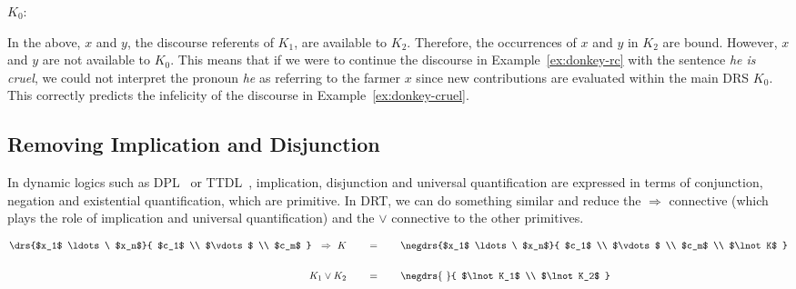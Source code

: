 \begin{flushleft}
  $K_0$: \hspace{-42mm} 
\end{flushleft}

In the above, $x$ and $y$, the discourse referents of $K_1$, are available
to $K_2$. Therefore, the occurrences of $x$ and $y$ in $K_2$ are
bound. However, $x$ and $y$ are not available to $K_0$. This means that if
we were to continue the discourse in Example~\ref{ex:donkey-rc} with the
sentence \emph{he is cruel}, we could not interpret the pronoun \emph{he}
as referring to the farmer $x$ since new contributions are evaluated within
the main DRS $K_0$. This correctly predicts the infelicity of the discourse
in Example~\ref{ex:donkey-cruel}.

\begin{exe}
\end{exe}


\subsection{Removing Implication and Disjunction}
\label{ssec:drt-implication-disjunction}

In dynamic logics such as DPL~\cite{groenendijk1991dynamic} or
TTDL~\cite{de2006towards,lebedeva2012expression}, implication, disjunction
and universal quantification are expressed in terms of conjunction,
negation and existential quantification, which are primitive. In DRT, we
can do something similar and reduce the $\Rightarrow$ connective (which
plays the role of implication and universal quantification) and the $\lor$
connective to the other primitives.

\begin{align*}
\drs{$x_1$ \ldots\ $x_n$}{
  $c_1$ \\
  $\vdots$ \\
  $c_m$ 
}~~
\Rightarrow~
K
\qquad &= \qquad
\negdrs{$x_1$ \ldots\ $x_n$}{
  $c_1$ \\
  $\vdots$ \\
  $c_m$ \\
  $\lnot K$
} \\
  \\
K_1 \lor K_2
\qquad &= \qquad
\negdrs{\ }{
  $\lnot K_1$ \\
  $\lnot K_2$
}
\end{align*}

